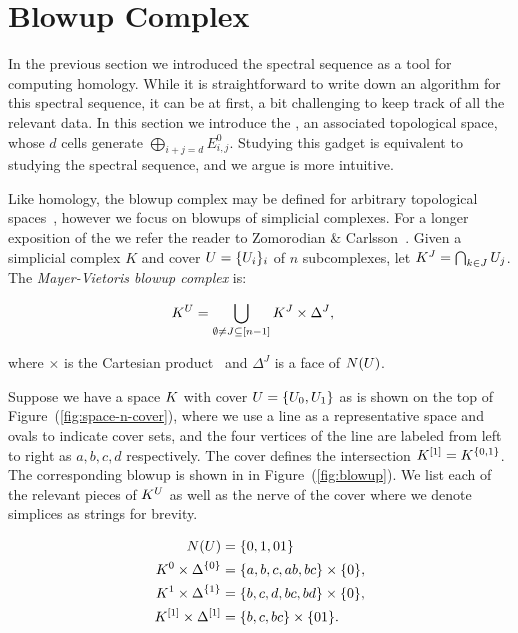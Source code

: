 \section{Blowup Complex}

In the previous section we introduced the \mv spectral sequence as a tool for computing homology.
While it is straightforward to write down an algorithm for this spectral sequence, it can be at first, a bit challenging to keep track of all the relevant data. In this section we introduce the \mvb, an associated topological space, whose $d$ cells generate $\bigoplus_{i+j = d} E^0_{i,j}$. Studying this gadget is equivalent to studying the spectral sequence, and we argue is more intuitive.

Like homology, the blowup complex may be defined for arbitrary topological 
spaces~\cite{zc-lh-08}, however we focus on blowups of simplicial 
complexes. For a longer exposition of the \mvb{} we refer the reader to Zomorodian
\& Carlsson~\cite{zc-lh-08}. Given a simplicial complex $K$ and cover 
$U = \{U_i\}_i$ of $n$ subcomplexes, let 
$K^J = \bigcap_{k \in J} U_j$. The \emph{Mayer-Vietoris blowup complex} is:
\begin{linenomath*}
\begin{align*}
K^U &= \bigcup_{\emptyset \not = J \subseteq [n-1]} K^J \times \Delta^J,
\end{align*}
\end{linenomath*}
where $\times$ is the Cartesian product~\cite{zc-lh-08} and $\Delta^J$ is a face of $N(U)$. 

\begin{example}
\label{ex:blowup}
Suppose we have a space $K$ with cover $U = \{ U_0, U_1 \}$ as is shown on 
the top of Figure~(\ref{fig:space-n-cover}), where we use a line as a 
representative space and ovals to indicate cover sets, and the four vertices
of the line are labeled from left to right as $a, b, c, d$ respectively.
The cover defines the intersection $K^{[1]} = K^{ \{ 0 , 1 \} }$. 
The corresponding blowup is shown in in Figure~(\ref{fig:blowup}). We list each of
the relevant pieces of $K^{U}$ as well as the nerve of the cover where we denote simplices as strings for 
brevity.  
\begin{linenomath*}
\begin{align*}
N(U) &= \{ 0, 1, 01 \} \\
K^0 \times \Delta^{\{0\}} &= \{a,b,c,ab,bc\} \times \{0\}, \\
K^1 \times \Delta^{\{1\}} &= \{b,c,d,bc,bd\} \times \{0\}, \\
K^{[1]} \times \Delta^{[1]} &=\{b,c,bc\} \times \{01\}. 
\end{align*}
\end{linenomath*}
\end{example}

